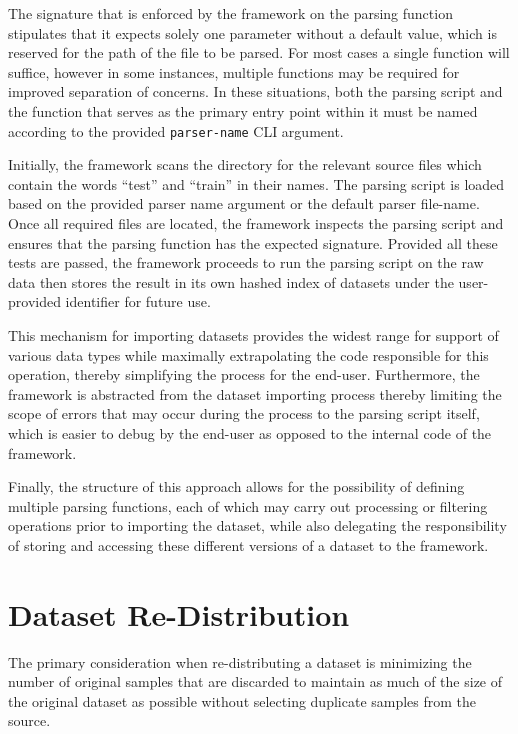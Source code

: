 \documentclass[12pt, a4paper]{report}
\theoremstyle{definition}
\theoremstyle{definition}%
\theoremstyle{definition}%
\theoremstyle{definition}%
\theoremstyle{definition}%
\theoremstyle{definition}%
\begin{document}
The signature that is enforced by the framework on the parsing function stipulates that it expects solely one parameter without a default value, which is reserved for the path of the file to be parsed. For most cases a single function will suffice, however in some instances, multiple functions may be required for improved  separation of concerns. In these situations, both the parsing script and the function that serves as the primary entry point within it must be named according to the provided \texttt{parser-name} CLI argument. 

Initially, the framework scans the directory for the relevant source files which contain the words \enquote{test} and \enquote{train} in their names. The parsing script is loaded based on the provided parser name argument or the default parser file-name. Once all required files are located, the framework inspects the parsing script and ensures that the parsing function has the expected signature. Provided all these tests are passed, the framework proceeds to run the parsing script on the raw data then stores the result in its own hashed index of datasets under the user-provided identifier for future use.

This mechanism for importing datasets provides the widest range for support of various data types while maximally extrapolating the code responsible for this operation, thereby simplifying the process for the end-user. Furthermore, the framework is abstracted from the dataset importing process thereby limiting the scope of errors that may occur during the process to the parsing script itself, which is easier to debug by the end-user as opposed to the internal code of the framework.

Finally, the structure of this approach allows for the possibility of defining multiple parsing functions, each of which may carry out processing or filtering operations prior to importing the dataset, while also delegating the responsibility of storing and accessing these different versions of a dataset to the framework.

\section{Dataset Re-Distribution} \label{sec:dataset_redist}
The primary consideration when re-distributing a dataset is minimizing the number of original samples that are discarded to maintain as much of the size of the original dataset as possible without selecting duplicate samples from the source.
\end{document}
